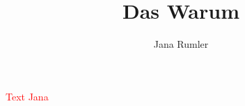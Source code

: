 \documentclass[output=paper]{langsci/langscibook}
\title{Das Warum}
\author{Jana Rumler}
\begin{document}
\maketitle

\noindent \textcolor{red}{Text Jana}
\end{document}
